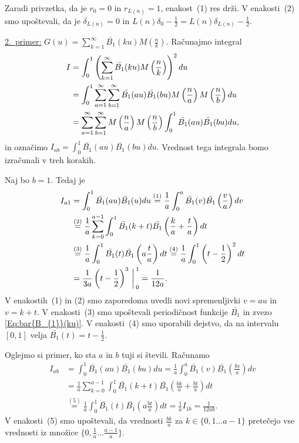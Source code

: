 \documentclass[mat1]{fmfdelo}
\begin{document}
Zaradi privzetka, da je $r_{0}=0$ in $r_{L(n)}=1$, enakost~(1) res drži.
V enakosti~(2) smo upoštevali, da je $\delta_{L(n)}=0$ in $L(n) \delta_{0}-\frac{1}{2} = L(n) \delta_{L(n)}-\frac{1}{2}.$

\underline{2.~primer:} $G(u) = \sum_{k=1}^{\infty} \bar{B_{1}}(ku) M \left(\frac{n}{k} \right)$.
Računajmo integral
\begin{align}
\label{Eq:I_{ab}}
I &= \int_{0}^1 \left( \sum_{k=1}^{\infty} \bar{B_{1}}(ku) M \left(\frac{n}{k} \right) \right)^2 du \nonumber \\
  &= \int_{0}^1 \sum_{a=1}^{\infty} \sum_{b=1}^{\infty} \bar{B_{1}}(au) \bar{B_{1}}(bu) M \left(\frac{n}{a} \right) M \left(\frac{n}{b} \right) du \nonumber \\
  &= \sum_{a=1}^{\infty} \sum_{b=1}^{\infty} M \left(\frac{n}{a} \right) M \left(\frac{n}{b} \right) \int_{0}^1 \bar{B_{1}}(au) \bar{B_{1}}(bu) du,
\end{align}
% 
in označimo $I_{ab} = \int_{0}^1 \bar{B_{1}}(au) \bar{B_{1}}(bu) du.$ Vrednost tega integrala bomo izračunali v treh korakih.

Naj bo $b=1$. Tedaj je
\begin{align}
I_{a1} &= \int_{0}^1 \bar{B_{1}}(au) \bar{B_{1}}(u) du
	\stackrel{(1)}{=} \frac{1}{a} \int_{0}^a \bar{B_{1}}(v) \bar{B_{1}} \left(\frac{v}{a} \right) dv \nonumber \\
	&\stackrel{(2)}{=} \frac{1}{a} \sum_{k=0}^{a-1} \int_{0}^1 \bar{B_{1}}(k+t) \bar{B_{1}} \left(\frac{k}{a}+\frac{t}{a} \right) dt \nonumber \\
	&\stackrel{(3)}{=} \frac{1}{a} \int_{0}^1 \bar{B_{1}}(t) \bar{B_{1}} \left(a\frac{t}{a} \right) dt
	\stackrel{(4)}{=} \frac{1}{a} \int_{0}^1 \left( t-\frac{1}{2} \right)^2 dt \nonumber \\
	&= \frac{1}{3a} \left( t-\frac{1}{2} \right)^3 \bigg \arrowvert_{0}^{1}
	= \frac{1}{12a}.
\end{align}
V enakostih~(1) in (2) smo zaporedoma uvedli novi spremenljivki $v=au$ in $v=k+t$. V enakosti~(3) smo upoštevali periodičnost funkcije $\bar{B_{1}}$ in zvezo \eqref{Eq:bar{B_{1}}(ku)}. V enakosti~(4) smo uporabili dejstvo, da na intervalu $[0,1]$ velja $\bar{B_{1}}(t) = t-\frac{1}{2}$.

Oglejmo si primer, ko sta $a$ in $b$ tuji si števili. Računamo
\begin{align}
I_{ab} &= \int_{0}^1 \bar{B_{1}}(au) \bar{B_{1}}(bu) du
	= \frac{1}{a} \int_{0}^a \bar{B_{1}}(v) \bar{B_{1}} \left(\frac{bv}{a} \right) dv \nonumber \\
	&= \frac{1}{a} \sum_{k=0}^{a-1} \int_{0}^1 \bar{B_{1}}(k+t) \bar{B_{1}} \left(\frac{bk}{a}+\frac{bt}{a} \right) dt \nonumber \\
	&\stackrel{(5)}{=} \frac{1}{a} \int_{0}^1 \bar{B_{1}}(t) \bar{B_{1}} \left(a\frac{bt}{a} \right) dt
	= \frac{1}{a} I_{1b} 
	= \frac{1}{12ab}.
\end{align}
V enakosti~(5) smo upoštevali, da vrednosti $\frac{bk}{a}$ za $k \in \{0,1 \ldots {a-1} \}$ pretečejo vse vrednosti iz množice $\{0, \frac{1}{a} \ldots \frac{a-1}{a}\}$.
\end{document}
